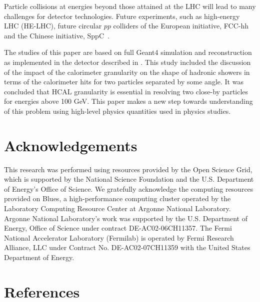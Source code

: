 \documentclass[final,1p,11pt]{elsarticle}
\begin{document}
Particle collisions at energies  beyond those attained at the LHC will lead to many challenges for detector technologies.
Future experiments, such as high-energy LHC (HE-LHC),
future circular $pp$ colliders of the European initiative, FCC-hh~\cite{Benedikt:2206376} and the Chinese initiative, SppC~\cite{Tang:2015qga}.


The studies of this paper are based on full Geant4 simulation and reconstruction as implemented in the detector described in
\cite{Chekanov:2016ppq}. This study included the discussion of the impact of the calorimeter granularity on the
shape of hadronic showers in terms of the calorimeter hits 
for two particles separated  by some angle. It was concluded that HCAL granularity is essential in resolving two close-by particles for energies above 100 GeV. This paper makes a new step towards understanding of this problem using
high-level physics quantities used in physics studies.
  









\section*{Acknowledgements}
This research was performed using resources provided by the Open Science Grid,
which is supported by the National Science Foundation and the U.S. Department of Energy's Office of Science. 
We gratefully acknowledge the computing resources provided on Blues, 
a high-performance computing cluster operated by the Laboratory Computing Resource Center at Argonne National Laboratory.
Argonne National Laboratory's work was supported by the U.S. Department of Energy, Office of Science under contract DE-AC02-06CH11357.
The Fermi National Accelerator Laboratory (Fermilab) is operated by Fermi Research Alliance, LLC under Contract No. DE-AC02-07CH11359 with the United States Department of Energy.

\newpage
\section*{References}


\def\bibname{\Large\bf References}
\def\refname{\Large\bf References}
\pagestyle{plain}

\end{document}
